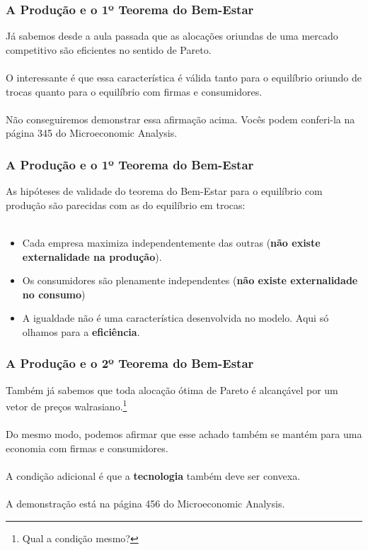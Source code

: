 \documentclass{beamer}[10]
\begin{document}
\begin{frame}
	\frametitle{A Produção e o 1º Teorema do Bem-Estar}

	Já sabemos desde a aula passada que as alocações oriundas de uma mercado competitivo são eficientes no sentido de Pareto.
	\\~\\
	O interessante é que essa característica é válida tanto para o equilíbrio oriundo de trocas quanto para o equilíbrio com firmas e consumidores.
	\\~\\
	Não conseguiremos demonstrar essa afirmação acima. Vocês podem conferi-la na página 345 do Microeconomic Analysis.

\end{frame}

\begin{frame}
	\frametitle{A Produção e o 1º Teorema do Bem-Estar}

	As hipóteses de validade do teorema do Bem-Estar para o equilíbrio com produção são parecidas com as do equilíbrio em trocas:
	\\~\\
	\begin{itemize}
		\item Cada empresa maximiza independentemente das outras (\textbf{não existe externalidade na produção}).
		\item Os consumidores são plenamente independentes (\textbf{não existe externalidade no consumo})
		\item A igualdade não é uma característica desenvolvida no modelo. Aqui só olhamos para a \textbf{eficiência}.
	\end{itemize}

\end{frame}

\begin{frame}
	\frametitle{A Produção e o 2º Teorema do Bem-Estar}

	Também já sabemos que toda alocação ótima de Pareto é alcançável por um vetor de preços walrasiano.\footnote{Qual a condição mesmo?}
	\\~\\
	Do mesmo modo, podemos afirmar que esse achado também se mantém para uma economia com firmas e consumidores.
	\\~\\
	A condição adicional é que a \textbf{tecnologia} também deve ser convexa.
	\\~\\
	A demonstração está na página 456 do Microeconomic Analysis.

\end{frame}
\end{document}
